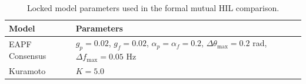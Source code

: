 \begin{table}[htbp]
\centering
\footnotesize
\caption{Locked model parameters used in the formal mutual HIL comparison.}
\label{tab:parameters}
\begin{tabular}{@{}lp{10.5cm}@{}}
\toprule
\textbf{Model} & \textbf{Parameters} \\
\midrule
EAPF Consensus & $g_p=0.02$, $g_f=0.02$, $\alpha_p=\alpha_f=0.2$, $\Delta\theta_{\mathrm{max}}=0.2$ rad, $\Delta f_{\mathrm{max}}=0.05$ Hz \\
Kuramoto & $K=5.0$ \\
\bottomrule
\end{tabular}
\end{table}

